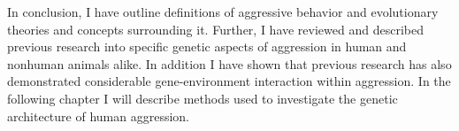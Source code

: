 In conclusion, I have outline definitions of aggressive behavior and evolutionary theories and concepts surrounding it.
Further, I have reviewed and described previous research into specific genetic aspects of aggression in human and nonhuman animals alike.
In addition I have shown that previous research has also demonstrated considerable gene-environment interaction within aggression.
In the following chapter I will describe methods used to investigate the genetic architecture of human aggression.
